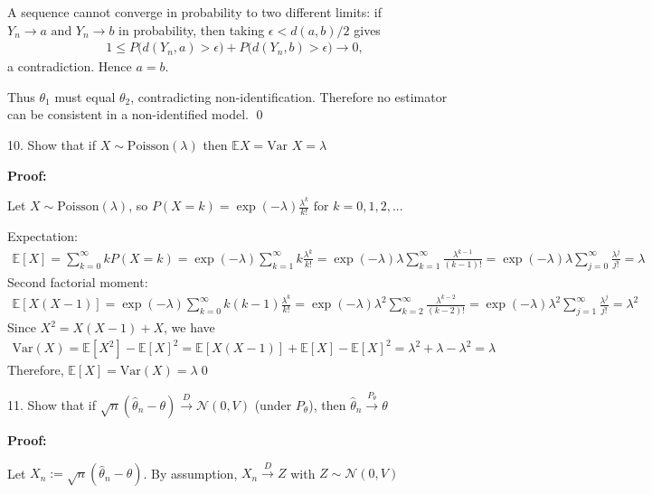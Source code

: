 \documentclass[10pt]{article}
\begin{document}
A sequence cannot converge in probability to two different limits: if $Y_n\to a \text{ and } Y_n\to b $ in probability, then taking $\epsilon < d(a, b) / 2 $ gives 
\begin{gather*}
    1 \le P\big(d(Y_n, a) > \epsilon\big) + P\big(d(Y_n, b) > \epsilon\big)\to 0,
\end{gather*}
a contradiction. Hence $a = b $.

Thus $\theta_1 $ must equal $\theta_2 $, contradicting non-identification. Therefore no estimator can be consistent in a non-identified model. \qed

\newpage

10. Show that if $X \sim \text{Poisson}(\lambda)$ then $\mathbb{E}X = \text{Var }X = \lambda $

\textbf{Proof:}

Let $X \sim\text{Poisson}(\lambda)$, so $P(X = k) = \exp(-\lambda)\frac{\lambda^k}{k!}\text{ for }k = 0, 1, 2, ...$

Expectation: 
\begin{gather*}
    \mathbb{E}[X] = \sum_{k = 0}^{\infty}kP(X = k) = \exp(-\lambda)\sum_{k = 1}^{\infty}k\frac{\lambda^k}{k!} = \exp(-\lambda)\lambda\sum_{k = 1}^{\infty}\frac{\lambda^{k - 1}}{(k - 1)!} = \exp(-\lambda)\lambda\sum_{j = 0}^{\infty}\frac{\lambda^j}{j!} = \lambda
\end{gather*}
Second factorial moment:
\begin{gather*}
    \mathbb{E}[X(X - 1)] = \exp(-\lambda)\sum_{k = 0}^{\infty}k(k - 1)\frac{\lambda^k}{k!} = \exp(-\lambda)\lambda^2\sum_{k = 2}^{\infty}\frac{\lambda^{k - 2}}{(k - 2)!} = \exp(-\lambda)\lambda^2\sum_{j = 1}^{\infty}\frac{\lambda^j}{j!} = \lambda^2
\end{gather*}
Since $X^2 = X(X - 1) + X $, we have 
\begin{gather*}
    \text{Var}(X) = \mathbb{E}[X^2] - \mathbb{E}[X]^2 = \mathbb{E}[X(X - 1)] + \mathbb{E}[X] - \mathbb{E}[X]^2 = \lambda^2 + \lambda - \lambda^2 = \lambda
\end{gather*}
Therefore, $\mathbb{E}[X] = \text{Var}(X) = \lambda $\qed

\hfill 

11. Show that if $\sqrt{n}(\hat{\theta}_n - \theta) \xrightarrow{D} \mathcal{N}(0, V)$ (under $P_\theta $), then $\hat{\theta}_n\xrightarrow{P_\theta}\theta $

\textbf{Proof:}

Let $X_n := \sqrt{n}(\hat{\theta}_n - \theta)$. By assumption, $X_n \xrightarrow{D} Z $ with $Z\sim \mathcal{N}(0, V)$
\end{document}
